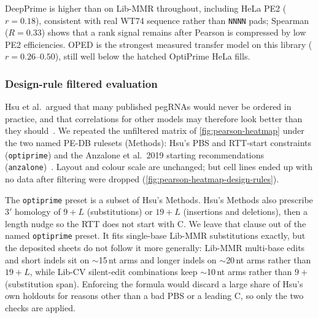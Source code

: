 \documentclass{article}
\begin{document}
DeepPrime is higher than on Lib-MMR throughout, including HeLa PE2 ($r = 0.18$), consistent with real WT74 sequence rather than \texttt{NNNN} pads; Spearman ($R = 0.33$) shows that a rank signal remains after Pearson is compressed by low PE2 efficiencies. OPED is the strongest measured transfer model on this library ($r = 0.26$--$0.50$), still well below the hatched OptiPrime HeLa fills.

\subsubsection{Design-rule filtered evaluation}

Hsu et al.\ argued that many published pegRNAs would never be ordered in practice, and that correlations for other models may therefore look better than they should~\cite{hsuMechanisticMachineLearning2026}. We repeated the unfiltered matrix of \autoref{fig:pearson-heatmap} under the two named PE-DB rulesets (Methods): Hsu's PBS and RTT-start constraints (\nolinkurl{optiprime}) and the Anzalone et al.\ 2019 starting recommendations (\nolinkurl{anzalone})~\cite{anzaloneSearchandreplaceGenomeEditing2019}. Layout and colour scale are unchanged; but cell lines ended up with no data after filtering were dropped (\autoref{fig:pearson-heatmap-design-rules}).

The \nolinkurl{optiprime} preset is a subset of Hsu's Methods.
Hsu's Methods also prescribe 3$'$ homology of $9+L$ (substitutions) or $19+L$ (insertions and deletions), then a length nudge so the RTT does not start with C. We leave that clause out of the named \nolinkurl{optiprime} preset. It fits single-base Lib-MMR substitutions exactly, but the deposited sheets do not follow it more generally: Lib-MMR multi-base edits and short indels sit on ${\sim}$15\,nt arms and longer indels on ${\sim}$20\,nt arms rather than $19+L$, while Lib-CV silent-edit combinations keep ${\sim}$10\,nt arms rather than $9+$ (substitution span). Enforcing the formula would discard a large share of Hsu's own holdouts for reasons other than a bad PBS or a leading C, so only the two checks are applied.
\end{document}
